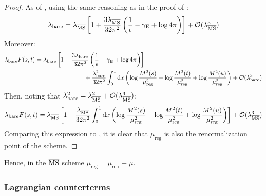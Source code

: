 \begin{proofbox}
  \begin{proof}
    As of , using the same reasoning as in the proof of :
    \begin{equation}
      \lambda_\text{bare} = \lambda_{\overline{\text{MS}}} \left[ 1 + \frac{3\lambda_{\overline{\text{MS}}}}{32\pi^2} \left( \frac{1}{\epsilon} - \gamma_\text{E} + \log 4\pi \right) \right] + \mathcal{O}(\lambda_{\overline{\text{MS}}}^3)
    \end{equation}
    Moreover:
    \begin{equation*}
      \begin{split}
        \lambda_\text{bare} F(s,t)
        & = \lambda_\text{bare} \left[ 1 - \frac{3\lambda_\text{bare}}{32\pi^2} \left( \frac{1}{\epsilon} - \gamma_\text{E} + \log 4\pi \right) \right] \\
        & \qquad \qquad \qquad \qquad  + \frac{\lambda_\text{bare}^2}{32\pi^2} \int_0^1 \mathrm{d} x \left( \log \frac{M^2(s)}{\mu_\text{reg}^2} + \log \frac{M^2(t)}{\mu_\text{reg}^2} + \log \frac{M^2(u)}{\mu_\text{reg}^2} \right) + \mathcal{O}(\lambda_\text{bare}^3) \\
      \end{split}
    \end{equation*}
    Then, noting that $ \lambda_\text{bare}^2 = \lambda_{\overline{\text{MS}}}^2 + \mathcal{O}(\lambda_{\overline{\text{MS}}}^3) $:
    \begin{equation*}
      \lambda_\text{bare} F(s,t) = \lambda_{\overline{\text{MS}}} \left[ 1 + \frac{\lambda_{\overline{\text{MS}}}}{32\pi^2} \int_0^1 \mathrm{d} x \left( \log \frac{M^2(s)}{\mu_\text{reg}^2} + \log \frac{M^2(t)}{\mu_\text{reg}^2} + \log \frac{M^2(u)}{\mu_\text{reg}^2} \right) \right] + \mathcal{O}(\lambda_{\overline{\text{MS}}}^3)
    \end{equation*}
    Comparing this expression to , it is clear that $ \mu_\text{reg} $ is also the renormalization point of the scheme.
  \end{proof}
\end{proofbox}

Hence, in the $ \overline{\text{MS}} $ scheme $ \mu_\text{reg} = \mu_\text{ren} \equiv \mu $.

\subsubsection{Lagrangian counterterms}
\label{sssec:lag-count}

